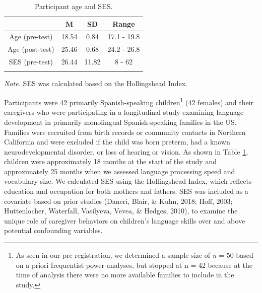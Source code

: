 \documentclass[
  man,mask,floatsintext]{apa6}
\begin{document}
\begin{table}[tbp]

\begin{center}
\begin{threeparttable}

\caption{\label{tab:tab0}Participant age and SES.}

\begin{tabular}{cccc}
\toprule
  & \multicolumn{1}{c}{M} & \multicolumn{1}{c}{SD} & \multicolumn{1}{c}{Range}\\
\midrule
Age (pre-test) & 18.54 & 0.84 & 17.1 - 19.8\\
Age (post-test) & 25.46 & 0.68 & 24.2 - 26.8\\
SES (pre-test) & 26.44 & 11.82 & 8 - 62\\
\bottomrule
\addlinespace
\end{tabular}

\begin{tablenotes}[para]
\normalsize{\textit{Note.} SES was calculated based on the Hollingshead Index.}
\end{tablenotes}

\end{threeparttable}
\end{center}

\end{table}

Participants were 42 primarily Spanish-speaking children\footnote{As seen in our pre-registration, we determined a sample size of \emph{n} = 50 based on a priori frequentist power analyses, but stopped at n = 42 because at the time of analysis there were no more available families to include in the study.} (42 females) and their caregivers who were participating in a longitudinal study examining language development in primarily monolingual Spanish-speaking families in the US. Families were recruited from birth records or community contacts in Northern California and were excluded if the child was born preterm, had a known neurodevelopmental disorder, or loss of hearing or vision. As shown in Table \ref{tab:tab0}, children were approximately 18 months at the start of the study and approximately 25 months when we assessed language processing speed and vocabulary size. We calculated SES using the Hollingshead Index, which reflects education and occupation for both mothers and fathers. SES was included as a covariate based on prior studies (Daneri, Blair, \& Kuhn, 2018; Hoff, 2003; Huttenlocher, Waterfall, Vasilyeva, Vevea, \& Hedges, 2010), to examine the unique role of caregiver behaviors on children's language skills over and above potential confounding variables.
\end{document}
